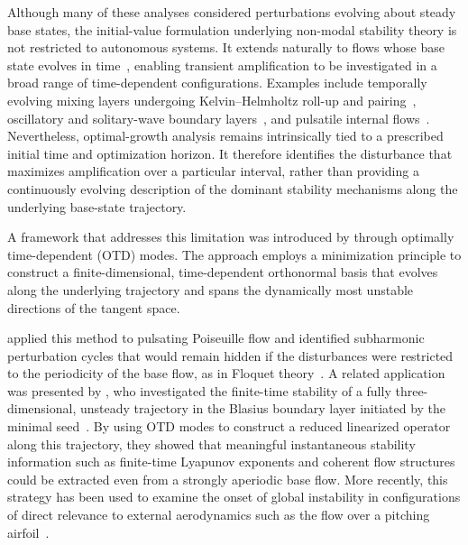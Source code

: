 Although many of these analyses considered perturbations evolving about steady base states, the initial-value formulation underlying non-modal stability theory is not restricted to autonomous systems. It extends naturally to flows whose base state evolves in time~\citep{schmid-2007}, enabling transient amplification to be investigated in a broad range of time-dependent configurations. Examples include temporally evolving mixing layers undergoing Kelvin--Helmholtz roll-up and pairing~\citep{arratia-caulfield-chomaz-2013,kaminski-caulfield-taylor-2014}, oscillatory and solitary-wave boundary layers~\citep{biau-2016,verschaeve-pedersen-tropea-2018}, and pulsatile internal flows~\citep{xu-song-avila-2021,pier-schmid-2021}. Nevertheless, optimal-growth analysis remains intrinsically tied to a prescribed initial time and optimization horizon. It therefore identifies the disturbance that maximizes amplification over a particular interval, rather than providing a continuously evolving description of the dominant stability mechanisms along the underlying base-state trajectory.

A framework that addresses this limitation was introduced by \citet{babaee-sapsis-2016} through optimally time-dependent (OTD) modes. The approach employs a minimization principle to construct a finite-dimensional, time-dependent orthonormal basis that evolves along the underlying trajectory and spans the dynamically most unstable directions of the tangent space.

\citet{kern-et-al-2021} applied this method to pulsating Poiseuille flow and identified subharmonic perturbation cycles that would remain hidden if the disturbances were restricted to the periodicity of the base flow, as in Floquet theory~\citep{davis-1976}. A related application was presented by \citet{beneitez-et-al-2023}, who investigated the finite-time stability of a fully three-dimensional, unsteady trajectory in the Blasius boundary layer initiated by the minimal seed~\citep{pringle-kerswell-2010,cherubini-et-al-2011}. By using OTD modes to construct a reduced linearized operator along this trajectory, they showed that meaningful instantaneous stability information such as finite-time Lyapunov exponents and coherent flow structures could be extracted even from a strongly aperiodic base flow. More recently, this strategy has been used to examine the onset of global instability in configurations of direct relevance to external aerodynamics such as the flow over a pitching airfoil~\citep{kern-et-al-2024}.


